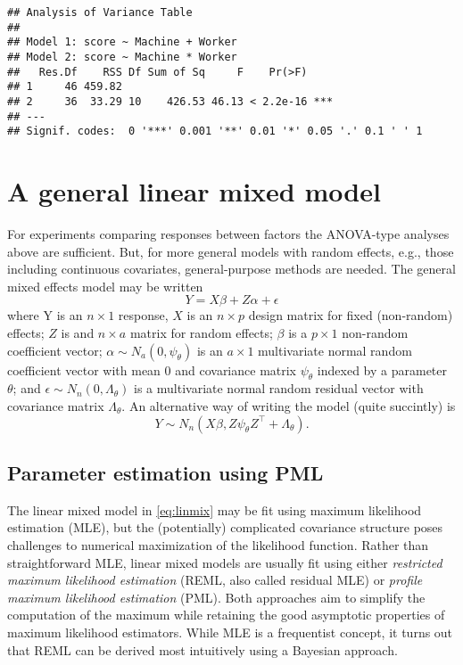 \documentclass[
]{book}
\begin{document}
\begin{verbatim}
## Analysis of Variance Table
## 
## Model 1: score ~ Machine + Worker
## Model 2: score ~ Machine * Worker
##   Res.Df    RSS Df Sum of Sq     F    Pr(>F)    
## 1     46 459.82                                 
## 2     36  33.29 10    426.53 46.13 < 2.2e-16 ***
## ---
## Signif. codes:  0 '***' 0.001 '**' 0.01 '*' 0.05 '.' 0.1 ' ' 1
\end{verbatim}

\hypertarget{a-general-linear-mixed-model}{%
\section{A general linear mixed model}\label{a-general-linear-mixed-model}}

For experiments comparing responses between factors the ANOVA-type analyses above are sufficient. But, for more general models with random effects, e.g., those including continuous covariates, general-purpose methods are needed. The general mixed effects model may be written
\[Y = X\beta+ Z\alpha + \epsilon\]
where Y is an \(n\times 1\) response, \(X\) is an \(n \times p\) design matrix for fixed (non-random) effects; \(Z\) is and \(n\times a\) matrix for random effects; \(\beta\) is a \(p\times 1\) non-random coefficient vector; \(\alpha\sim N_a(0, \psi_\theta)\) is an \(a\times 1\) multivariate normal random coefficient vector with mean 0 and covariance matrix \(\psi_\theta\) indexed by a parameter \(\theta\); and \(\epsilon\sim N_n(0, \Lambda_\theta)\) is a multivariate normal random residual vector with covariance matrix \(\Lambda_\theta\). An alternative way of writing the model (quite succintly) is
\begin{equation}
\label{eq:linmix}
Y\sim N_n(X\beta, Z \psi_\theta Z^\top + \Lambda_\theta).
\end{equation}

\hypertarget{parameter-estimation-using-pml}{%
\subsection{Parameter estimation using PML}\label{parameter-estimation-using-pml}}

The linear mixed model in \eqref{eq:linmix} may be fit using maximum likelihood estimation (MLE), but the (potentially) complicated covariance structure poses challenges to numerical maximization of the likelihood function. Rather than straightforward MLE, linear mixed models are usually fit using either \emph{restricted maximum likelihood estimation} (REML, also called residual MLE) or \emph{profile maximum likelihood estimation} (PML). Both approaches aim to simplify the computation of the maximum while retaining the good asymptotic properties of maximum likelihood estimators. While MLE is a frequentist concept, it turns out that REML can be derived most intuitively using a Bayesian approach.
\end{document}
